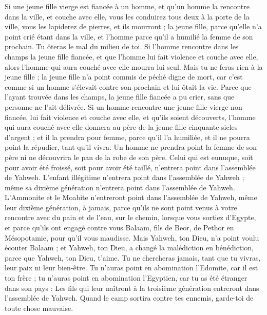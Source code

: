 \begin{multicols}{2}
Si une jeune fille vierge est fiancée à un homme, et qu’un homme la rencontre dans la ville, et couche avec elle,
vous les conduirez tous deux à la porte de la ville, vous les lapiderez de pierres, et ils mourront ; la jeune fille, parce qu'elle n’a point crié étant dans la ville, et l'homme parce qu'il a humilié la femme de son prochain. Tu ôteras le mal du milieu de toi.
Si l’homme rencontre dans les champs la jeune fille fiancée, et que l’homme lui fait violence et couche avec elle, alors l'homme qui aura couché avec elle mourra lui seul.
Mais tu ne feras rien à la jeune fille ; la jeune fille n'a point commis de péché digne de mort, car c’est comme si un homme s'élevait contre son prochain et lui ôtait la vie.
Parce que l'ayant trouvée dans les champs, la jeune fille fiancée a pu crier, sans que personne ne l’ait délivrée.
Si un homme rencontre une jeune fille vierge non fiancée, lui fait violence et couche avec elle, et qu'ils soient découverts,
l'homme qui aura couché avec elle donnera au père de la jeune fille cinquante sicles d'argent ; et il la prendra pour femme, parce qu'il l'a humiliée, et il ne pourra point la répudier, tant qu'il vivra.
Un homme ne prendra point la femme de son père ni ne découvrira le pan de la robe de son père.
\VerseOne{}Celui qui est eunuque, soit pour avoir été froissé, soit pour avoir été taillé, n'entrera point dans l'assemblée de Yahweh.
L’enfant illégitime n'entrera point dans l'assemblée de Yahweh ; même sa dixième génération n'entrera point dans l'assemblée de Yahweh.
L’Ammonite et le Moabite n'entreront point dans l'assemblée de Yahweh, même leur dixième génération, à jamais,
parce qu'ils ne sont point venus à votre rencontre avec du pain et de l'eau, sur le chemin, lorsque vous sortiez d'Egypte, et parce qu'ils ont engagé contre vous Balaam, fils de Beor, de Pethor en Mésopotamie, pour qu’il vous maudisse.
Mais Yahweh, ton Dieu, n’a point voulu écouter Balaam ; et Yahweh, ton Dieu, a changé la malédiction en bénédiction, parce que Yahweh, ton Dieu, t'aime.
Tu ne chercheras jamais, tant que tu vivras, leur paix ni leur bien-être.
Tu n'auras point en abomination l'Edomite, car il est ton frère ; tu n'auras point en abomination l'Egyptien, car tu as été étranger dans son pays :
Les fils qui leur naîtront à la troisième génération entreront dans l'assemblée de Yahweh.
Quand le camp sortira contre tes ennemis, garde-toi de toute chose mauvaise.

\end{multicols}
